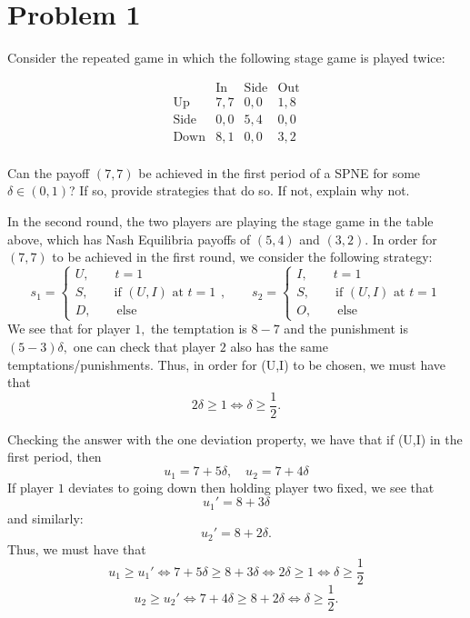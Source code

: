 \documentclass[11pt]{article}
\begin{document}
	
	
	\psetheader
\section*{Problem 1}
\begin{problem}
 Consider the repeated game in which the following stage game is played twice:   
\end{problem}




\[
\begin{array}{c|ccc}
 & \text{In} & \text{Side} & \text{Out} \\
\hline
\text{Up} & 7,7 & 0,0 & 1,8 \\
\text{Side} & 0,0 & 5,4 & 0,0 \\
\text{Down} & 8,1 & 0,0 & 3,2 \\
\end{array}
\]



Can the payoff $(7,7)$ be achieved in the first period of a SPNE for some $\delta \in (0,1)$? If so, provide strategies that do so. If not, explain why not.

\begin{solution}
    In the second round, the two players are playing the stage game in the table above, which has Nash Equilibria payoffs of $(5,4)$ and $(3,2).$ In order for $(7,7)$ to be achieved in the first round, we consider the following strategy:
    \[s_1 = 
    \begin{cases}
        U, \qquad t = 1\\
        S, \qquad \text{if $(U,I)$ at $t = 1$}\\
        D, \qquad \text{else}
    \end{cases}, \qquad s_2 = \begin{cases}
        I, \qquad t = 1\\
        S, \qquad \text{if $(U,I)$ at $t = 1$}\\
        O, \qquad \text{else}
    \end{cases}\]
    We see that for player $1,$ the temptation is $8-7$ and the punishment is $(5-3)\delta,$ one can check that player $2$ also has the same temptations/punishments. Thus, in order for (U,I) to be chosen, we must have that 
    \[2\delta \geq 1 \iff \delta \geq \frac{1}{2}.\] 

    Checking the answer with the one deviation property, we have that if (U,I) in the first period, then 
    \[u_1 = 7 + 5\delta, \quad u_2 = 7 + 4\delta\] If player $1$ deviates to going down then holding player two fixed, we see that 
    \[u_1' = 8 + 3\delta\] and similarly:
    \[u_2' = 8 + 2\delta.\]
    Thus, we must have that 
    \[u_1 \geq u_1' \iff 7 + 5\delta \geq 8 + 3\delta \iff 2\delta \geq 1 \iff \delta\geq \frac{1}{2}\]
    \[u_2 \geq u_2' \iff 7 + 4\delta \geq 8 + 2\delta \iff \delta \geq \frac{1}{2}.\]
\end{solution}
\end{document}
